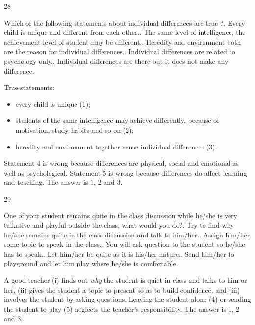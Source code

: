 \begin{question}{28}
{Which of the following statements about individual differences are true ?. Every child is unique and different from each other.. The same level of intelligence, the achievement level of student may be different.. Heredity and environment both are the reason for individual differences.. Individual differences are related to psychology only.. Individual differences are there but it does not make any difference.\par}
\begin{explain}
True statements:
\begin{itemize}
\item every child is unique (1);
\item students of the same intelligence may achieve differently, because of motivation, study habits and so on (2);
\item heredity and environment together cause individual differences (3).
\end{itemize}
Statement 4 is wrong because differences are physical, social and emotional as well as psychological. Statement 5 is wrong because differences do affect learning and teaching. The answer is 1, 2 and 3.
\end{explain}
\end{question}

\begin{question}{29}
{One of your student remains quite in the class discussion while he/she is very talkative and playful outside the class, what would you do?. Try to find why he/she remains quite in the class discussion and talk to him/her.. Assign him/her some topic to speak in the class.. You will ask question to the student so he/she has to speak.. Let him/her be quite as it is his/her nature.. Send him/her to playground and let him play where he/she is comfortable.\par}
\begin{explain}
A good teacher (i) finds out \emph{why} the student is quiet in class and talks to him or her, (ii) gives the student a topic to present so as to build confidence, and (iii) involves the student by asking questions. Leaving the student alone (4) or sending the student to play (5) neglects the teacher's responsibility. The answer is 1, 2 and 3.
\end{explain}
\end{question}

